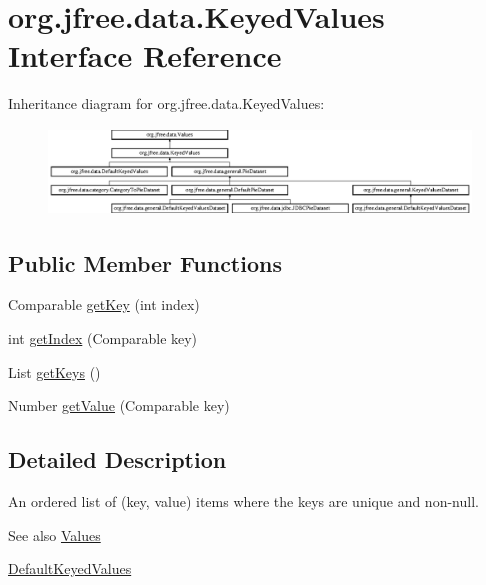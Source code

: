 \hypertarget{interfaceorg_1_1jfree_1_1data_1_1_keyed_values}{}\section{org.\+jfree.\+data.\+Keyed\+Values Interface Reference}
\label{interfaceorg_1_1jfree_1_1data_1_1_keyed_values}
Inheritance diagram for org.\+jfree.\+data.\+Keyed\+Values\+:\begin{figure}[H]
\begin{center}
\leavevmode
\includegraphics[height=2.295082cm]{interfaceorg_1_1jfree_1_1data_1_1_keyed_values}
\end{center}
\end{figure}
\subsection*{Public Member Functions}
\begin{DoxyCompactItemize}
\item 
Comparable \mbox{\hyperlink{interfaceorg_1_1jfree_1_1data_1_1_keyed_values_a830386de8513342d99845bbd9cb57bc4}{get\+Key}} (int index)
\item 
int \mbox{\hyperlink{interfaceorg_1_1jfree_1_1data_1_1_keyed_values_ae360fa76e98655c84180651f8e1395d7}{get\+Index}} (Comparable key)
\item 
List \mbox{\hyperlink{interfaceorg_1_1jfree_1_1data_1_1_keyed_values_a5bc1316f3c71eeaa6e38effe4ea660d5}{get\+Keys}} ()
\item 
Number \mbox{\hyperlink{interfaceorg_1_1jfree_1_1data_1_1_keyed_values_aa6bb7fe3ff33503d7f31b9be505c3a70}{get\+Value}} (Comparable key)
\end{DoxyCompactItemize}


\subsection{Detailed Description}
An ordered list of (key, value) items where the keys are unique and non-\/{\ttfamily null}.

\begin{DoxySeeAlso}{See also}
\mbox{\hyperlink{interfaceorg_1_1jfree_1_1data_1_1_values}{Values}} 

\mbox{\hyperlink{classorg_1_1jfree_1_1data_1_1_default_keyed_values}{Default\+Keyed\+Values}} 
\end{DoxySeeAlso}



